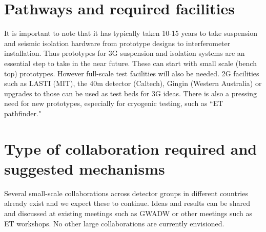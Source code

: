 \section{Pathways and required facilities}

It is important to note that it has typically taken 10-15 years to take suspension and seismic isolation hardware from prototype designs to interferometer installation. Thus prototypes for 3G suspension and isolation systems are an essential step to take in the near future. These can start with small scale (bench top) prototypes. However full-scale test facilities will also be needed. 2G facilities such as LASTI (MIT), the 40m detector (Caltech), Gingin (Western Australia)
or upgrades to those can be used as test beds for 3G ideas. There is also a pressing need for new prototypes, especially for cryogenic testing, such as ``ET pathfinder."

\section{Type of collaboration required and suggested mechanisms}

Several small-scale collaborations across detector groups in different countries already exist and we expect these to continue.  Ideas and results can be shared and discussed at existing meetings such as GWADW or other meetings such as ET workshops. No other large collaborations are currently envisioned.






